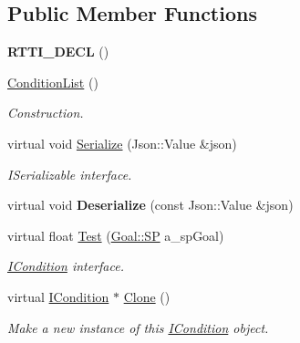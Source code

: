 \subsection*{Public Member Functions}
\begin{DoxyCompactItemize}
\item 
\mbox{\label{struct_condition_list_a2b2cd18f8ac989cda6120ca339ae5003}} 
{\bfseries R\+T\+T\+I\+\_\+\+D\+E\+CL} ()
\item 
\mbox{\label{struct_condition_list_a2002ae78b220eac60694a784d331bee7}} 
\hyperlink{struct_condition_list_a2002ae78b220eac60694a784d331bee7}{Condition\+List} ()
\begin{DoxyCompactList}\small\item\em Construction. \end{DoxyCompactList}\item 
\mbox{\label{struct_condition_list_abe86a57fb0fe6623e86bfa7440bd5576}} 
virtual void \hyperlink{struct_condition_list_abe86a57fb0fe6623e86bfa7440bd5576}{Serialize} (Json\+::\+Value \&json)
\begin{DoxyCompactList}\small\item\em I\+Serializable interface. \end{DoxyCompactList}\item 
\mbox{\label{struct_condition_list_ae565ff13a90835d55e8453a063e1c43f}} 
virtual void {\bfseries Deserialize} (const Json\+::\+Value \&json)
\item 
\mbox{\label{struct_condition_list_a4b86083a53a1f1eea704c6857345661f}} 
virtual float \hyperlink{struct_condition_list_a4b86083a53a1f1eea704c6857345661f}{Test} (\hyperlink{class_goal_a818ae12a4d1f28bd433dab2a830a390e}{Goal\+::\+SP} a\+\_\+sp\+Goal)
\begin{DoxyCompactList}\small\item\em \hyperlink{class_i_condition}{I\+Condition} interface. \end{DoxyCompactList}\item 
\mbox{\label{struct_condition_list_ae978d4a93f85cc5c0742f1d2c8608ba3}} 
virtual \hyperlink{class_i_condition}{I\+Condition} $\ast$ \hyperlink{struct_condition_list_ae978d4a93f85cc5c0742f1d2c8608ba3}{Clone} ()
\begin{DoxyCompactList}\small\item\em Make a new instance of this \hyperlink{class_i_condition}{I\+Condition} object. \end{DoxyCompactList}\end{DoxyCompactItemize}
